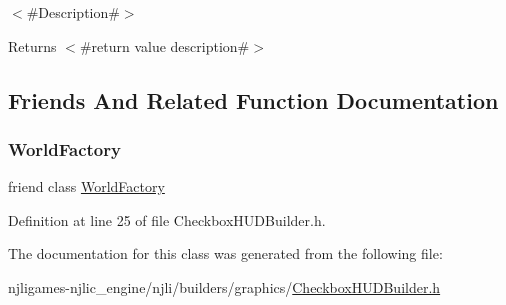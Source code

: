 $<$\#\+Description\#$>$

\begin{DoxyReturn}{Returns}
$<$\#return value description\#$>$ 
\end{DoxyReturn}


\subsection{Friends And Related Function Documentation}
\mbox{\label{classnjli_1_1_checkbox_h_u_d_builder_acb96ebb09abe8f2a37a915a842babfac}} 
\subsubsection{\texorpdfstring{World\+Factory}{WorldFactory}}
{\footnotesize\ttfamily friend class \mbox{\hyperlink{classnjli_1_1_world_factory}{World\+Factory}}\hspace{0.3cm}{\ttfamily [friend]}}



Definition at line 25 of file Checkbox\+H\+U\+D\+Builder.\+h.



The documentation for this class was generated from the following file\+:\begin{DoxyCompactItemize}
\item 
njligames-\/njlic\+\_\+engine/njli/builders/graphics/\mbox{\hyperlink{_checkbox_h_u_d_builder_8h}{Checkbox\+H\+U\+D\+Builder.\+h}}\end{DoxyCompactItemize}
